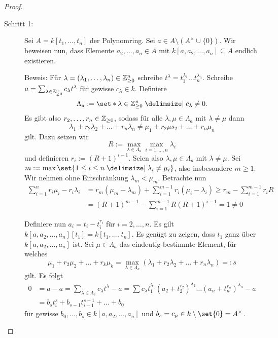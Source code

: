 \documentclass[12pt,a4paper]{scrartcl}
\theoremstyle{cplain}
\theoremstyle{cdef}
\begin{document}
\begin{proof}
	\leavevmode
	\begin{description}
		\item[Schritt 1:] Sei $A = k[t_1,\dots, t_n]$ der Polynomring. Sei $a\in A\setminus(A^{\times}\cup \{0\})$. Wir beweisen nun, dass Elemente $a_2,\dots, a_n\in A$ mit $k[a, a_2,\dots, a_n]\subseteq A$ endlich existieren.
		
		Beweis: Für $\lambda = (\lambda_1,\dots, \lambda_n)\in\mathbb Z_{\geq 0}^n$ schreibe $t^{\lambda} = t_1^{\lambda_1}\dots t_n^{\lambda_n}$. Schreibe $a = \sum_{\lambda\in\mathbb Z_{\geq 0}^n} c_{\lambda}t^{\lambda}$ für gewisse $c_{\lambda}\in k$. Definiere
		\[\Lambda_a := \set*{\lambda\in\IZ_{\geq 0}^n \given c_{\lambda}\neq 0}.\]
		Es gibt also $r_2,\dots, r_n\in\mathbb Z_{\geq 0}$, sodass für alle $\lambda, \mu\in \Lambda_a$ mit $\lambda\neq \mu$ dann
		\[\lambda_1+r_2\lambda_2+\dots +r_n\lambda_n\neq \mu_1+r_2\mu s_2+\dots + r_n\mu_n\]
		gilt. Dazu setzen wir \[R := \max\limits_{\lambda\in\Lambda_a}\max_{i = 1,\dots, n}\lambda _i\] und definieren $r_i := (R+1)^{i-1}$. Seien also $\lambda,\mu \in \Lambda_a$ mit $\lambda\neq\mu$. Sei $m := \max\set{1\le i \le n \given \lambda_i \neq \mu_i}$, also insbesondere $m\ge 1$. Wir nehmen ohne Einschränkung $\lambda_m < \mu_m$. Betrachte nun \begin{align*}
			\sum_{i = 1}^nr_i\mu_i-r_i\lambda_i &= r_m(\mu_m-\lambda_m)+\sum_{i = 1}^{m-1}r_i(\mu_i-\lambda_i)\geq r_m-\sum_{i = 1}^{m-1}r_iR \\ &= (R+1)^{m-1}-\sum_{i = 1}^{m-1} R(R+1)^{i-1} = 1\neq 0
		\end{align*}
		
		Definiere nun $a_i = t_i-t_i^{r_i}$ für $i = 2, \dots, n$. Es gilt $k[a,a_2,\dots, a_n][t_1] = k[t_1,\dots, t_n]$. Es genügt zu zeigen, dass $t_1$ ganz über $k[a,a_2,\dots, a_n]$ ist. Sei $\mu\in\Lambda_a$ das eindeutig bestimmte Element, für welches
		\[\mu_1+r_2\mu_2+\dots+r_k\mu_k = \max\limits_{\lambda\in\Lambda_a}(\lambda_1+r_2\lambda_2+\dots+r_n\lambda_n) =: s\] gilt.
		Es folgt \begin{align*}
			0 &= a-a = \sum_{\lambda\in\Lambda_a}c_{\lambda}t^{\lambda}-a = \sum c_{\lambda}t_1^{\lambda_1}(a_2+t_2^{r_2})^{\lambda_2}\dots (a_n+t_n^{r_n})^{\lambda_n} -a \\ &= b_st_i^s+b_{s-1}t_{i-1}^{s-1}+\dots +b_0
		\end{align*}
		für gewisse $b_0,\dots, b_s\in k[a, a_2,\dots, a_n]$ und $b_s = c_{\mu} \in k\setminus \set{0} = A^{\times}$.
		

\end{description}
\end{proof}
\end{document}
